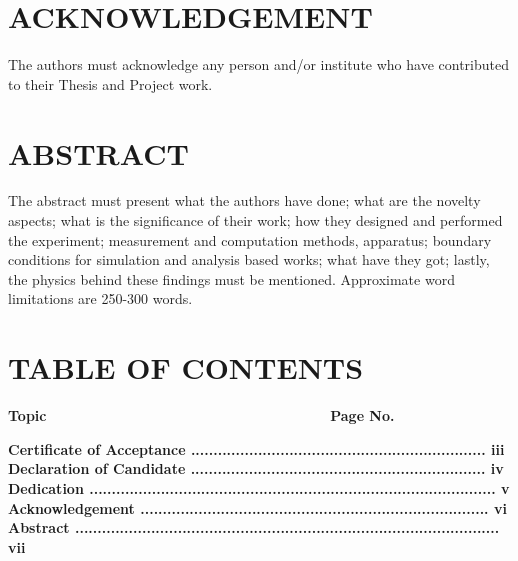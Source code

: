 \documentclass[11pt,a4paper,oneside]{memoir}
\begin{document}
\chapter*{ACKNOWLEDGEMENT}
The authors must acknowledge any person and/or institute who have contributed to their Thesis and Project work.\\

\chapter*{ABSTRACT}
The abstract must present what the authors have done; what are the novelty aspects; what is the significance of their work; how they designed and performed the experiment; measurement and computation methods, apparatus; boundary conditions for simulation and analysis based works; what have they got; lastly, the physics behind these findings must be mentioned. Approximate word limitations are 250-300 words.

\chapter*{TABLE OF CONTENTS}
{\LARGE
\textbf{Topic \,\,\,\,\,\,\,\,\,\,\,\,\,\,\,\,\,\,\,\,\,\,\,\,\,\,\,\,\,\,\,\,\,\,\,\,\,\,\,\,\,\,\,\,\,\,\,\,\,\,\,\,\,\,\,\,\,\,\,\,\,\,\,\,\,\,\,\,\,\,\,\,\,\,\,\,\,\,\,\,\,\,\,\,\,\,\,\,\,\,\,\,\,\,\,\,\,\,\,\,\,\,\,\,\,\,\,\,\,\,\,\,\,\,\,\,\, Page No.}\\
}
\vspace{0.5cm}

{\Large
\textbf{Certificate of Acceptance .................................................................. iii}
}\\

{\Large
\textbf{Declaration of Candidate .................................................................. iv}
}\\

{\Large
\textbf{Dedication ........................................................................................... v}
}\\

{\Large
\textbf{Acknowledgement .............................................................................. vi}
}\\

{\Large
\textbf{Abstract ............................................................................................... vii}
}\\
\end{document}
